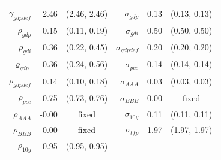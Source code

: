 \documentclass[12pt]{article}
\begin{document}
{\begin{longtable}{rrc@{\hspace{1in}}rrc}
$\gamma_{gdpdef}$ & 2.46 & (2.46, 2.46) & $\sigma_{gdp}$ & 0.13 & (0.13, 0.13) \\
$\rho_{gdp}$ & 0.15 & (0.11, 0.19) & $\sigma_{gdi}$ & 0.50 & (0.50, 0.50) \\
$\rho_{gdi}$ & 0.36 & (0.22, 0.45) & $\sigma_{gdpdef}$ & 0.20 & (0.20, 0.20) \\
$\varrho_{gdp}$ & 0.36 & (0.24, 0.56) & $\sigma_{pce}$ & 0.14 & (0.14, 0.14) \\
$\rho_{gdpdef}$ & 0.14 & (0.10, 0.18) & $\sigma_{AAA}$ & 0.03 & (0.03, 0.03) \\
$\rho_{pce}$ & 0.75 & (0.73, 0.76) & $\sigma_{BBB}$ & 0.00 & \scriptsize{fixed} \\
$\rho_{AAA}$ & -0.00 & \scriptsize{fixed} & $\sigma_{10y}$ & 0.11 & (0.11, 0.11) \\
$\rho_{BBB}$ & -0.00 & \scriptsize{fixed} & $\sigma_{tfp}$ & 1.97 & (1.97, 1.97) \\
$\rho_{10y}$ & 0.95 & (0.95, 0.95) & & & \\[3pt]
\end{longtable}}
\end{document}
